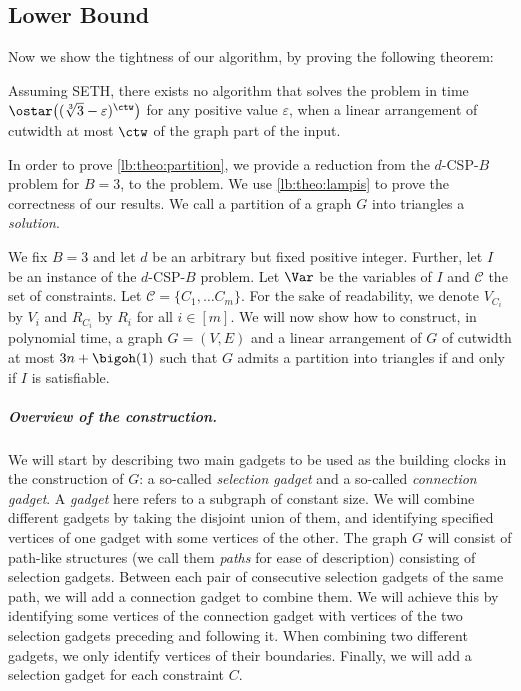 \documentclass[a4paper,UKenglish,cleveref, autoref, thm-restate]{lipics-v2021}
\begin{document}
\subsection{Lower Bound}

Now we show the tightness of our algorithm, by proving the following theorem:

\begin{theorem}\label{lb:theo:partition}
Assuming SETH, there exists no algorithm that solves the \Tpartp problem in time $\ostar\big((\sqrt[3]{3}-\varepsilon)^{\ctw}\big)$ for any positive value $\varepsilon$, when a linear arrangement of cutwidth at most $\ctw$ of the graph part of the input.
\end{theorem}

In order to prove \cref{lb:theo:partition}, we provide a reduction from the $d$-CSP-$B$ problem for $B=3$, to the \Tpartp problem. We use \cref{lb:theo:lampis} to prove the correctness of our results.
We call a partition of a graph $G$ into triangles a \emph{solution}.
 
We fix $B=3$ and let $d$ be an arbitrary but fixed positive integer. 
Further, let $I$ be an instance of the $d$-CSP-$B$ problem.
Let $\Var$ be the variables of $I$ and $\mathcal{C}$ the set of constraints. Let $\mathcal{C} = \{C_1, \dots C_m\}$. For the sake of readability, we denote $V_{C_i}$ by $V_i$ and $R_{C_i}$ by $R_i$ for all $i\in[m]$. 
We will now show how to construct, in polynomial time, a graph $G = (V, E)$ and a linear arrangement of $G$ of cutwidth at most $3n + \bigoh(1)$ such that $G$ admits a partition into triangles if and only if $I$ is satisfiable.

\subparagraph*{Overview of the construction.} We will start by describing two main gadgets to be used as the building clocks in the construction of $G$: a so-called \emph{selection gadget} and a so-called \emph{connection gadget}. A \emph{gadget} here refers to a subgraph of constant size. We will combine different gadgets by taking the disjoint union of them, and identifying specified vertices of one gadget with some vertices of the other. The graph $G$ will consist of path-like structures (we call them \emph{paths} for ease of description) consisting of selection gadgets. Between each pair of consecutive selection gadgets of the same path, we will add a connection gadget to combine them. We will achieve this by identifying some vertices of the connection gadget with vertices of the two selection gadgets preceding and following it.
When combining two different gadgets, we only identify vertices of their boundaries.
Finally, we will add a selection gadget for each constraint $C$.
\end{document}
